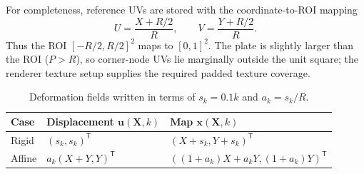 \documentclass[11pt,a4paper]{article}
\begin{document}
For completeness, reference UVs are stored with the coordinate-to-ROI mapping
\begin{equation}
  U=\frac{X+R/2}{R},
  \qquad
  V=\frac{Y+R/2}{R}.
\end{equation}
Thus the ROI $[-R/2,R/2]^2$ maps to $[0,1]^2$.  The plate is slightly larger
than the ROI ($P>R$), so corner-node UVs lie marginally outside the unit square;
the renderer texture setup supplies the required padded texture coverage.

\begin{table}[h]
\centering
\begin{tabular}{@{}lll@{}}
\toprule
Case & Displacement $\mathbf{u}(\mathbf{X},k)$ & Map $\mathbf{x}(\mathbf{X},k)$ \\
\midrule
Rigid & $(s_k,s_k)^\mathsf{T}$ & $(X+s_k,Y+s_k)^\mathsf{T}$ \\
Affine & $a_k(X+Y,Y)^\mathsf{T}$ & $((1+a_k)X+a_kY,(1+a_k)Y)^\mathsf{T}$ \\
\bottomrule
\end{tabular}
\caption{Deformation fields written in terms of $s_k=0.1k$ and $a_k=s_k/R$.}
\end{table}
\end{document}
